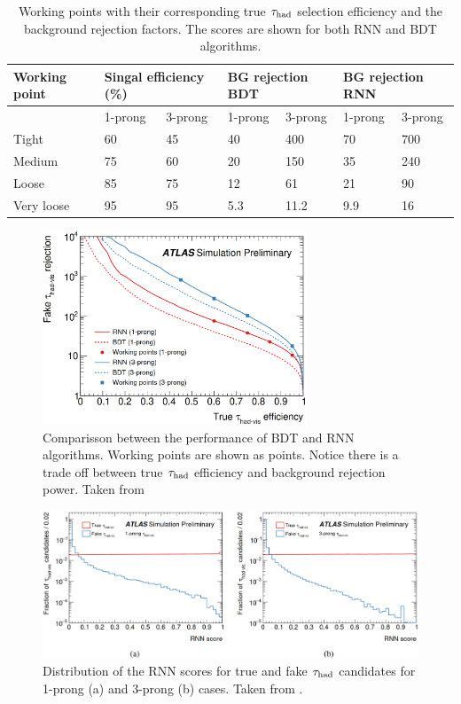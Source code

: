 \begin{table}[]
	\begin{tabular}{|l|l|l|l|l|l|l|}
		\hline
		Working point & \multicolumn{2}{l|}{Singal efficiency (\%)} & \multicolumn{2}{l|}{BG rejection BDT} & \multicolumn{2}{l|}{BG rejection RNN} \\ \hline
		& 1-prong              & 3-prong              & 1-prong               & 3-prong               & 1-prong               & 3-prong               \\ \hline
		Tight         & 60                   & 45                   & 40                    & 400                   & 70                    & 700                   \\ \hline
		Medium        & 75                   & 60                   & 20                    & 150                   & 35                    & 240                   \\ \hline
		Loose         & 85                   & 75                   & 12                    & 61                    & 21                    & 90                    \\ \hline
		Very loose    & 95                   & 95                   & 5.3                   & 11.2                  & 9.9                   & 16                    \\ \hline
	\end{tabular}
	\caption{Working points with their corresponding true $\tau_\text{had}$ selection efficiency and the background rejection factors. The scores are shown for both RNN and BDT algorithms.}
	\label{Table2}
\end{table}
\begin{figure}[h]
	\centering
	\includegraphics[width=0.7\textwidth]{figures/Fig5}
	\caption{Comparisson between the performance of BDT and RNN algorithms. Working points are shown as points. Notice there is a trade off between true $\tau_\text{had}$ efficiency and background rejection power. Taken from \cite{Deutsch:2680523}}
	\label{Fig5}
\end{figure}
\begin{figure}[h]
	\centering
	\includegraphics[width=1\textwidth]{figures/Fig6}
	\caption{Distribution of the RNN scores for true and fake $\tau_\text{had}$ candidates for 1-prong (a) and 3-prong (b) cases. Taken from \cite{Deutsch:2680523}.}
	\label{Fig6}
\end{figure}